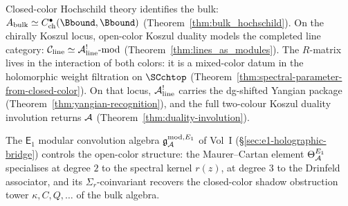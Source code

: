 \begin{remark}
\label{rem:triangle-two-colors}
Closed-color Hochschild theory identifies the bulk:
$A_{\mathrm{bulk}} \simeq C^\bullet_{\mathrm{ch}}(\Bbound,\Bbound)$
(Theorem~\ref{thm:bulk_hochschild}).
On the chirally Koszul locus, open-color Koszul duality models the
completed line category:
$\mathcal{C}_{\mathrm{line}} \simeq
\mathcal{A}^!_{\mathrm{line}}\text{-mod}$
(Theorem~\ref{thm:lines_as_modules}).
The $R$-matrix lives in the interaction of both colors: it is a
mixed-color datum in the holomorphic weight filtration on $\SCchtop$
(Theorem~\ref{thm:spectral-parameter-from-closed-color}).
On that locus, $\mathcal{A}^!_{\mathrm{line}}$ carries the dg-shifted
Yangian package (Theorem~\ref{thm:yangian-recognition}), and the full
two-colour Koszul duality involution returns $\mathcal{A}$
(Theorem~\ref{thm:duality-involution}).

The $\mathsf{E}_1$ modular convolution algebra
$\mathfrak{g}_{\mathcal{A}}^{\mathrm{mod},E_1}$
of Vol~I (\S\ref{sec:e1-holographic-bridge}) controls the
open-color structure: the Maurer--Cartan element
$\Theta_{\mathcal{A}}^{E_1}$ specialises at degree $2$ to the spectral
kernel $r(z)$, at degree $3$ to the Drinfeld associator, and its
$\Sigma_r$-coinvariant recovers the closed-color shadow obstruction
tower $\kappa, C, Q, \ldots$ of the bulk algebra.
\end{remark}

